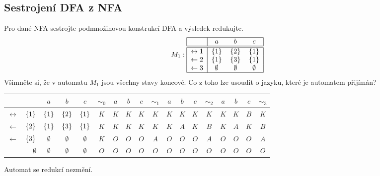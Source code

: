 \subsection{Sestrojení DFA z NFA}
Pro dané NFA sestrojte podmnožinovou konstrukcí DFA a výsledek redukujte.
\[
M_1:
\begin{tabular}{|r|c c c|}
    \hline
    & $a$ & $b$ & $c$\\
    \hline
    \hline
    $\leftrightarrow 1$& $\bc{1}$ & $\bc{2}$& $\bc{1}$\\
    $\leftarrow2$      & $\bc{1}$ & $\bc{3}$& $\bc{1}$\\
    $\leftarrow3$      & $\emptyset$ & $\emptyset$& $\emptyset$\\
    \hline
\end{tabular}
\]
Všimněte si, že v automatu $M_1$ jsou všechny stavy koncové. Co z toho lze usoudit o jazyku, které je automatem přijímán?
\begin{center}
    \begin{tabular}{|r r|c c c||c|c c c||c|c c c||c|c c c||c|}
        \hline
        & $ $ & $ a $ & $ b $ & $ c $ & $ \sim_0 $ & $ a $ & $ b $ & $ c $ & $ \sim_1 $ & $ a $ & $ b $ & $ c $ & $ \sim_2 $ & $ a $ & $ b $ & $ c $ & $ \sim_3 $ \\ \hline \hline
        $\leftrightarrow$& $\left\lbrace 1 \right\rbrace  $ & $ \left\lbrace 1 \right\rbrace    $ & $ \left\lbrace 2 \right\rbrace    $ & $ \left\lbrace 1 \right\rbrace    $ & $ K $ & $ K $ & $ K $ & $ K $ & $ K $ & $ K $ & $ K $ & $ K $ & $ K $ & $ K $ & $ K $ & $ B $ & $ K $ \\
        $\leftarrow$     & $\left\lbrace 2 \right\rbrace  $ & $ \left\lbrace 1 \right\rbrace    $ & $ \left\lbrace 3 \right\rbrace    $ & $ \left\lbrace 1 \right\rbrace    $ & $ K $ & $ K $ & $ K $ & $ K $ & $ K $ & $ K $ & $ A $ & $ K $ & $ B $ & $ K $ & $ A $ & $ K $ & $ B $ \\
        $\leftarrow$     & $\left\lbrace 3 \right\rbrace  $ & $ \emptyset $ & $ \emptyset $ & $ \emptyset $ & $ K $ & $ O $ & $ O $ & $ O $ & $ A $ & $ O $ & $ O $ & $ O $ & $ A $ & $ O $ & $ O $ & $ O $ & $ A $ \\
                         & $\emptyset$& $ \emptyset $ & $ \emptyset $ & $ \emptyset $ & $ O $ & $ O $ & $ O $ & $ O $ & $ O $ & $ O $ & $ O $ & $ O $ & $ O $ & $ O $ & $ O $ & $ O $ & $ O $ \\
        \hline
    \end{tabular}
\end{center}

Automat se redukcí nezmění.

